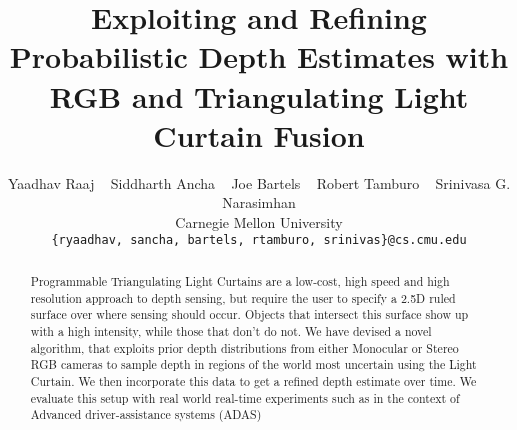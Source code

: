 \documentclass[review]{cvpr}
\begin{document}
\title{Exploiting and Refining Probabilistic Depth Estimates with RGB and Triangulating Light Curtain Fusion}

\author{Yaadhav Raaj ~ Siddharth Ancha ~ Joe Bartels ~ Robert Tamburo ~ Srinivasa G. Narasimhan\\
Carnegie Mellon University\\
{\tt\small \{ryaadhav, sancha, bartels, rtamburo, srinivas\}@cs.cmu.edu}
}

\maketitle

\begin{abstract}
Programmable Triangulating Light Curtains are a low-cost, high speed and high resolution approach to depth sensing, but require the user to specify a 2.5D ruled surface over where sensing should occur. Objects that intersect this surface show up with a high intensity, while those that don't do not. We have devised a novel algorithm, that exploits prior depth distributions from either Monocular or Stereo RGB cameras to sample depth in regions of the world most uncertain using the Light Curtain. We then incorporate this data to get a refined depth estimate over time. We evaluate this setup with real world real-time experiments such as in the context of Advanced driver-assistance systems (ADAS)
\end{abstract}

\iffalse
Introduction
Prior Work
   Joe's Paper
   Sid's Paper
   other stuff
Sensor setup
   Light Curtain Basics
   Our Jeep setup
   Calibration process (eqs. here)
Adaptive Sensing Formulation (say Light Curtain Only)
   Simulator
   3D Tensor to store Depth (initialization)
   Ray 2D Projection into Flat Plane
   Planning Formulation/Strategies Default/M1
   Probabilistic Formulation (Inverted Gaussian Model)
   Experiments (show Sim vs Real world, Indoor vs Outdoor):
      Basic Sweep visualization (sanity check)
      Prior sweeping approach
      Non Inverted vs Inverted
      STD encoding the uncertaintiy etc.
      Default vs M1 (and diff strategies)
   Having a Prior Depth (what if we had)
   Experiments here
         Show convergence speed/accuracy etc.
Generating Prior from RGB
   NN Formulation figure
   Soft CE, QPower, Left/Right Consistency (RGB + Depth), Smoothness
   Experiments:
      Show table for above
   LC Integration
   Experiments:
      3D Upsampling of Lidar
      Time feedback vs no
      Deep Learning vs no Deep Learning
Outdoor Experiments:
   etc.
Future Work
\fi
\end{document}
